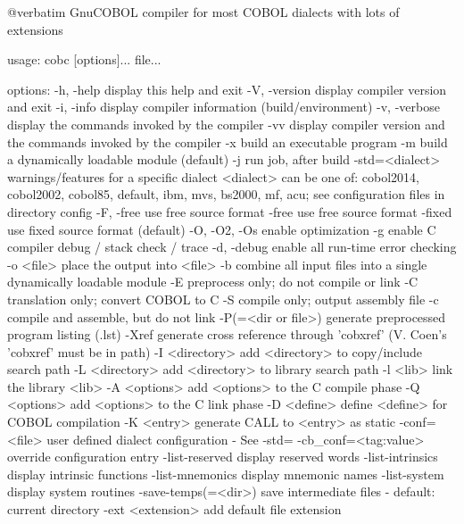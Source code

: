 @verbatim
GnuCOBOL compiler for most COBOL dialects with lots of extensions

usage: cobc [options]... file...

options:
  -h, -help             display this help and exit
  -V, -version          display compiler version and exit
  -i, -info             display compiler information (build/environment)
  -v, -verbose          display the commands invoked by the compiler
  -vv                   display compiler version and the commands
                        invoked by the compiler
  -x                    build an executable program
  -m                    build a dynamically loadable module (default)
  -j                    run job, after build
  -std=<dialect>        warnings/features for a specific dialect
                        <dialect> can be one of:
                        cobol2014, cobol2002, cobol85, default,
                        ibm, mvs, bs2000, mf, acu;
                        see configuration files in directory config
  -F, -free             use free source format
  -free                 use free source format
  -fixed                use fixed source format (default)
  -O, -O2, -Os          enable optimization
  -g                    enable C compiler debug / stack check / trace
  -d, -debug            enable all run-time error checking
  -o <file>             place the output into <file>
  -b                    combine all input files into a single
                        dynamically loadable module
  -E                    preprocess only; do not compile or link
  -C                    translation only; convert COBOL to C
  -S                    compile only; output assembly file
  -c                    compile and assemble, but do not link
  -P(=<dir or file>)    generate preprocessed program listing (.lst)
  -Xref                 generate cross reference through 'cobxref'
                        (V. Coen's 'cobxref' must be in path)
  -I <directory>        add <directory> to copy/include search path
  -L <directory>        add <directory> to library search path
  -l <lib>              link the library <lib>
  -A <options>          add <options> to the C compile phase
  -Q <options>          add <options> to the C link phase
  -D <define>           define <define> for COBOL compilation
  -K <entry>            generate CALL to <entry> as static
  -conf=<file>          user defined dialect configuration - See -std=
  -cb_conf=<tag:value>  override configuration entry
  -list-reserved        display reserved words
  -list-intrinsics      display intrinsic functions
  -list-mnemonics       display mnemonic names
  -list-system          display system routines
  -save-temps(=<dir>)   save intermediate files
                        - default: current directory
  -ext <extension>      add default file extension

